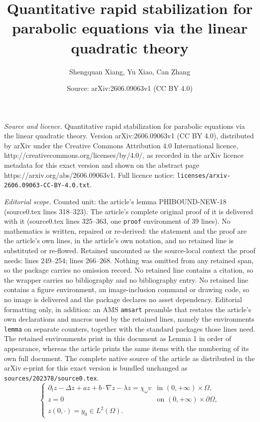\documentclass[10pt,a4paper]{amsart}
\title{Quantitative rapid stabilization for parabolic equations via the linear quadratic theory}
\author{Shengquan Xiang, Yu Xiao, Can Zhang}
\date{Source: arXiv:2606.09063v1 (CC BY 4.0)}
\begin{document}
\maketitle

\noindent\emph{Source and licence.} Quantitative rapid stabilization for parabolic equations via the linear quadratic theory. Version arXiv:2606.09063v1 (CC BY 4.0), distributed by arXiv under the Creative Commons Attribution 4.0 International licence, http://creativecommons.org/licenses/by/4.0/, as recorded in the arXiv licence metadata for this exact version and shown on the abstract page https://arxiv.org/abs/2606.09063v1. Full licence notice: \texttt{licenses/arxiv-2606.09063-CC-BY-4.0.txt}.\par\smallskip

\noindent\textit{Editorial scope.} Counted unit: the article's lemma PHIBOUND-NEW-18 (source0.tex lines 318--323). The article's complete original proof of it is delivered with it (source0.tex lines 325--363, one \texttt{proof} environment of 39 lines). No mathematics is written, repaired or re-derived: the statement and the proof are the article's own lines, in the article's own notation, and no retained line is substituted or re-flowed.  Retained uncounted as the source-local context the proof needs: lines 249--254; lines 266--268.  Nothing was omitted from any retained span, so the package carries no omission record.  No retained line contains a citation, so the wrapper carries no bibliography and no bibliography entry.  No retained line contains a figure environment, an image-inclusion command or drawing code, so no image is delivered and the package declares no asset dependency.  Editorial formatting only, in addition: an AMS \texttt{amsart} preamble that restates the article's own declarations and macros used by the retained lines, namely the environments \texttt{lemma} on separate counters, together with the standard packages those lines need.  The retained environments print in this document as Lemma 1 in order of appearance, whereas the article prints the same items with the numbering of its own full document.  The complete native source of the article as distributed in the arXiv e-print for this exact version is bundled unchanged as \texttt{sources/202378/source0.tex}.
\begin{equation}\label{TRANS-EQ}\begin{cases}
\partial_tz-\Delta z+az+b\cdot \nabla z-\lambda z=\chi_{\omega}v & \text{in } (0,+\infty)\times \Omega,\\[2mm]
z=0& \text{on }(0,+\infty)\times \partial\Omega,\\[2mm]
z( 0,\cdot)=y_0\in L^2(\Omega).
\end{cases}
\end{equation}
\end{document}

